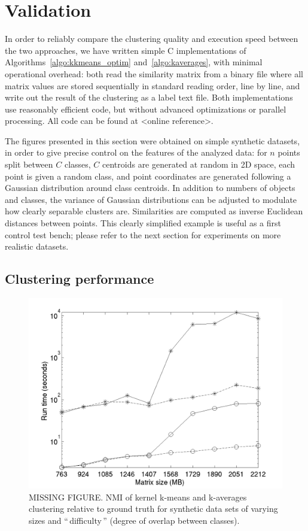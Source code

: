 \documentclass[a4paper,twoside]{article}
\newcommand{\gl}[1]{``\,#1\,''} %
\begin{document}
\section{Validation}
\label{sec:validation}

In order to reliably compare the clustering quality and execution speed between the two approaches, we have written simple C implementations of Algorithms~\ref{algo:kkmeans_optim} and~\ref{algo:kaverages}, with minimal operational overhead: both read the similarity matrix from a binary file where all matrix values are stored sequentially in standard reading order, line by line, and write out the result of the clustering as a label text file. Both implementations use reasonably efficient code, but without advanced optimizations or parallel processing. All code can be found at <online reference>.

The figures presented in this section were obtained on simple synthetic datasets, in order to give precise control on the features of the analyzed data: for $n$ points split between $C$ classes, $C$ centroids are generated at random in 2D space, each point is given a random class, and point coordinates are generated following a Gaussian distribution around class centroids. In addition to numbers of objects and classes, the variance of Gaussian distributions can be adjusted to modulate how clearly separable clusters are. Similarities are computed as inverse Euclidean distances between points. This clearly simplified example is useful as a first control test bench; please refer to the next section for experiments on more realistic datasets.

\subsection{Clustering performance}

\begin{figure}
\label{fig:synth_perf}
\center
\includegraphics[scale=0.6]{figures/simpleSwap.png} 
\caption{MISSING FIGURE. NMI of kernel k-means and k-averages clustering relative to ground truth for synthetic data sets of varying sizes and \gl{difficulty} (degree of overlap between classes).}
\end{figure}
\end{document}
